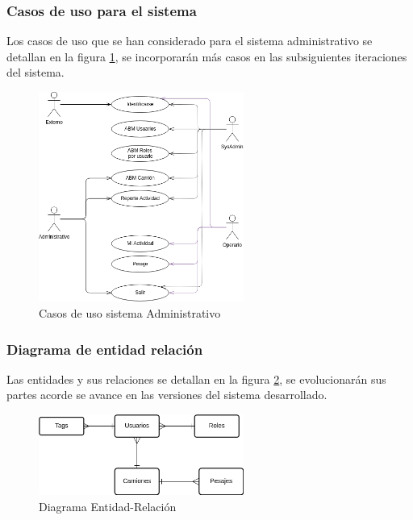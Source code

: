 \subsubsection{Casos de uso para el sistema}
Los casos de uso que se han considerado para el sistema administrativo se detallan en la figura \ref{fig:usecase-admin}, se incorporarán más casos en las subsiguientes iteraciones del sistema.
\begin{figure}[h!]
	\begin{center}
		\includegraphics[width=0.6\textwidth]{images/casos-sistema-admin.png}
		\caption{Casos de uso sistema Administrativo}
		\label{fig:usecase-admin}
	\end{center}
\end{figure}

\subsubsection{Diagrama de entidad relación}
Las entidades y sus relaciones se detallan en la figura \ref{fig:er}, se evolucionarán sus partes acorde se avance en las versiones del sistema desarrollado.
\begin{figure}[h!]
	\begin{center}
		\includegraphics[width=0.6\textwidth]{images/ER-SistemaAdmin.png}
		\caption{Diagrama Entidad-Relación}
		\label{fig:er}
	\end{center}
\end{figure}